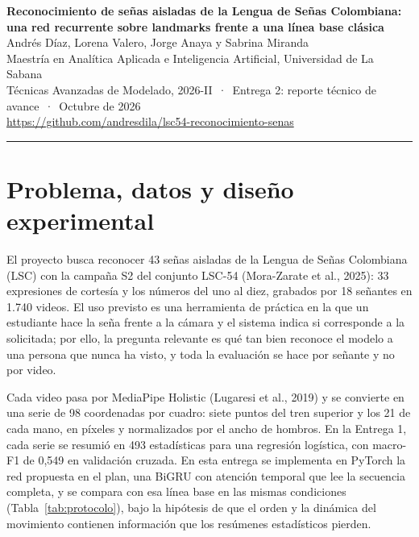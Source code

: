 \documentclass[11pt,a4paper]{article}
\begin{document}
\thispagestyle{plain}
\begin{center}
{\Large\bfseries Reconocimiento de señas aisladas de la Lengua de Señas Colombiana:\\[3pt] una red recurrente sobre landmarks frente a una línea base clásica}\\[8pt]
{\normalsize Andrés Díaz, Lorena Valero, Jorge Anaya y Sabrina Miranda}\\[3pt]
{\small Maestría en Analítica Aplicada e Inteligencia Artificial, Universidad de La Sabana}\\
{\small Técnicas Avanzadas de Modelado, 2026-II \,·\, Entrega 2: reporte técnico de avance \,·\, Octubre de 2026}\\[2pt]
{\small\url{https://github.com/andresdila/lsc54-reconocimiento-senas}}
\end{center}
\vspace{2pt}
\noindent\rule{\textwidth}{0.4pt}
\vspace{0pt}

\section{Problema, datos y diseño experimental}

El proyecto busca reconocer 43 señas aisladas de la Lengua de Señas Colombiana (LSC) con la campaña S2 del conjunto LSC-54 (Mora-Zarate et al., 2025): 33 expresiones de cortesía y los números del uno al diez, grabados por 18 señantes en 1.740 videos. El uso previsto es una herramienta de práctica en la que un estudiante hace la seña frente a la cámara y el sistema indica si corresponde a la solicitada; por ello, la pregunta relevante es qué tan bien reconoce el modelo a una persona que nunca ha visto, y toda la evaluación se hace por señante y no por video.

Cada video pasa por MediaPipe Holistic (Lugaresi et al., 2019) y se convierte en una serie de 98 coordenadas por cuadro: siete puntos del tren superior y los 21 de cada mano, en píxeles y normalizados por el ancho de hombros. En la Entrega 1, cada serie se resumió en 493 estadísticas para una regresión logística, con macro-F1 de 0,549 en validación cruzada. En esta entrega se implementa en PyTorch la red propuesta en el plan, una BiGRU con atención temporal que lee la secuencia completa, y se compara con esa línea base en las mismas condiciones (Tabla~\ref{tab:protocolo}), bajo la hipótesis de que el orden y la dinámica del movimiento contienen información que los resúmenes estadísticos pierden.
\end{document}
